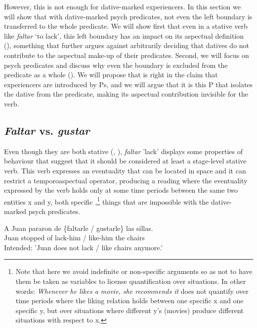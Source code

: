 \documentclass[output=paper,colorlinks,citecolor=brown,nonflat]{langsci/langscibook}
\begin{document}
However, this is not enough for dative-marked experiencers. In this section we will show that with dative-marked psych predicates, not even the left boundary is transferred to the whole predicate. We will show first that even in a stative verb like \textit{faltar} `to lack', this left boundary has an impact on its aspectual definition (), something that further argues against arbitrarily deciding that datives do not contribute to the aspectual make-up of their predicates. Second, we will focus on psych predicates and discuss why even the boundary is excluded from the predicate as a whole (). We will propose that \citet{Landau2010} is right in the claim that experiencers are introduced by Ps, and we will argue that it is this P that isolates the dative from the predicate, making its aspectual contribution invisible for the verb.

\subsection{\textit{Faltar} vs. \textit{gustar}}\label{sec:fabregas:3.1}

Even though they are both stative (, \citealt{GarcíaFernándezGutiérrezBergarecheMartinez2006}), \textit{faltar} {}'lack' displays some properties of behaviour that suggest that it should be considered at least a stage-level stative verb. This verb expresses an eventuality that can be located in space  and it can restrict a temporoaspectual operator, producing a reading where the eventuality expressed by the verb holds only at some time periods between the same two entities x and y, both specific \citet[cf. 27]{Kratzer1995},\footnote{Note that here we avoid indefinite or non-specific arguments so as not to have them be taken as variables to license quantification over situations. In other words: \textit{Whenever he likes a movie, she recommends it} does not quantify over time periods where the liking relation holds between one specific x and one specific y, but over situations where different y's (movies) produce different situations with respect to x.} things that are impossible with the dative-marked psych predicates.

\ea%
    \label{ex:fabregas:25}
    \gll    *A Juan  pararon de \{faltarle / gustarle\} las  sillas.\\
             {Juan} {stopped} {of}   {lack-him} {/} {like-him} {the} {chairs}\\
    \glt    Intended: 'Juan does not lack / like chairs anymore.'
    \z
\end{document}

